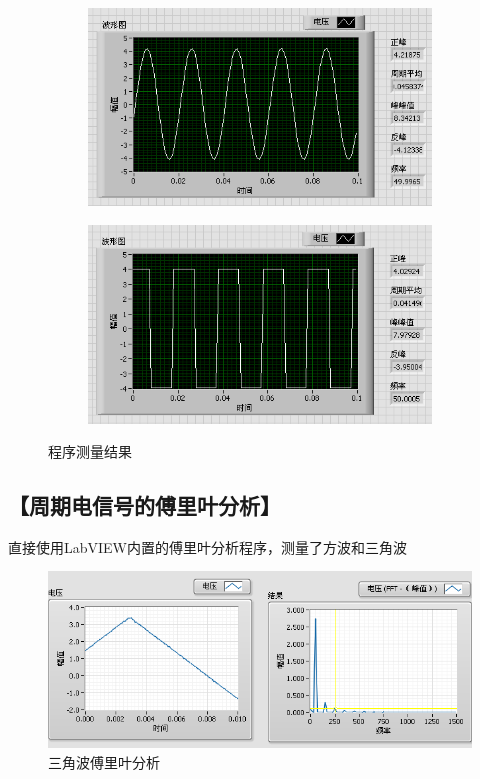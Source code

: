 \documentclass{ctexart}
\let\oldsubsection\subsection
\renewcommand{\subsection}[1]{\oldsubsection{\!\!\!\!\!\!【#1】}}
\begin{document}
\begin{figure}[H]
  \centering
  \begin{subfigure}{0.49\linewidth}
    \includegraphics[width=\linewidth]{LabVIEW使用基础/模拟信号测量/前面板-正弦波.PNG}
  \end{subfigure}
  \begin{subfigure}{0.49\linewidth}
    \includegraphics[width=\linewidth]{LabVIEW使用基础/模拟信号测量/前面板-方波.PNG}
  \end{subfigure}
  \caption{程序测量结果}
\end{figure}

\newpage
\subsection{周期电信号的傅里叶分析}

直接使用LabVIEW内置的傅里叶分析程序，测量了方波和三角波

\begin{figure}[H]
  \centering
  \includegraphics[width=0.98\linewidth]{LabVIEW使用基础/周期电信号的傅里叶分析/三角波.PNG}
  \caption{三角波傅里叶分析}
\end{figure}
\end{document}
